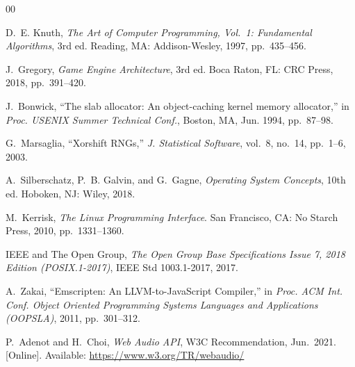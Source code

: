 \documentclass[conference]{IEEEtran}
\begin{document}
\begin{thebibliography}{00}

D.~E. Knuth, \textit{The Art of Computer Programming, Vol.~1: Fundamental
Algorithms}, 3rd ed. Reading, MA: Addison-Wesley, 1997, pp.~435--456.

J.~Gregory, \textit{Game Engine Architecture}, 3rd ed. Boca Raton, FL: CRC
Press, 2018, pp.~391--420.

J.~Bonwick, ``The slab allocator: An object-caching kernel memory allocator,''
in \textit{Proc. USENIX Summer Technical Conf.}, Boston, MA, Jun. 1994,
pp.~87--98.

G.~Marsaglia, ``Xorshift RNGs,'' \textit{J. Statistical Software}, vol.~8,
no.~14, pp.~1--6, 2003.

A.~Silberschatz, P.~B. Galvin, and G.~Gagne, \textit{Operating System
Concepts}, 10th ed. Hoboken, NJ: Wiley, 2018.

M.~Kerrisk, \textit{The Linux Programming Interface}. San Francisco, CA:
No Starch Press, 2010, pp.~1331--1360.

IEEE and The Open Group, \textit{The Open Group Base Specifications Issue 7,
2018 Edition (POSIX.1-2017)}, IEEE Std 1003.1-2017, 2017.

A.~Zakai, ``Emscripten: An LLVM-to-JavaScript Compiler,'' in \textit{Proc.
ACM Int. Conf. Object Oriented Programming Systems Languages and Applications
(OOPSLA)}, 2011, pp.~301--312.

P.~Adenot and H.~Choi, \textit{Web Audio API}, W3C Recommendation, Jun.\ 2021.
[Online]. Available: \url{https://www.w3.org/TR/webaudio/}

\end{thebibliography}
\end{document}
